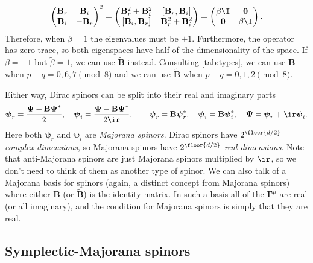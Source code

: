 \documentclass[11pt]{article}
\newcommand{\Gammab}{\boldsymbol{\Gamma}}
\newcommand{\B}{\mathbf{B}}
\newcommand{\Bt}{\widetilde{\B}}
\newcommand{\psib}{\boldsymbol{\psi}}
\newcommand{\Psib}{\boldsymbol{\Psi}}
\newcommand{\betat}{\tilde{\beta}}
\begin{document}
\begin{equation*}
    \begin{pmatrix}
      \B_r &  \B_i \\
      \B_i & -\B_r \\
    \end{pmatrix}^2
  =
    \begin{pmatrix}
      \B_r^2 + \B_i^2 & [\B_r, \B_i]    \\
      [\B_i, \B_r]    & \B_r^2 + \B_i^2 \\
    \end{pmatrix}
  =
    \begin{pmatrix}
      \beta \I   & \mathbf{0} \\
      \mathbf{0} & \beta \I   \\
    \end{pmatrix}.
\end{equation*}
%
Therefore, when $\beta=1$ the eigenvalues must be $\pm 1$.
Furthermore, the operator has zero trace, so both eigenspaces have half of the dimensionality of the space.
If $\beta=-1$ but $\betat=1$, we can use $\Bt$ instead.
Consulting \cref{tab:types}, we can use $\B$ when $p-q = 0,6,7 \pmod 8$ and we can use $\Bt$ when $p-q = 0,1,2 \pmod 8$.

Either way, Dirac spinors can be split into their real and imaginary parts
%
\begin{equation}\label{eq:majorana}
  \psib_r = \frac{\Psib + \B \Psib^\ast}{2},
  \quad
  \psib_i = \frac{\Psib - \B \Psib^\ast}{2\ir},
  \qquad
  \psib_r = \B \psib^\ast_r,
  \quad
  \psib_i = \B \psib^\ast_i,
  \quad
  \Psib = \psib_r + \ir \psib_i.
\end{equation}
%
Here both $\psib_r$ and $\psib_i$ are \emph{Majorana spinors}.
Dirac spinors have $2^{\floor{d/2}}$ \emph{complex dimensions}, so Majorana spinors have $2^{\floor{d/2}}$ \emph{real dimensions}.
Note that anti-Majorana spinors are just Majorana spinors multiplied by $\ir$, so we don't need to think of them as another type of spinor.
We can also talk of a Majorana basis for spinors (again, a distinct concept from Majorana spinors) where either $\B$ (or $\Bt$) is the identity matrix.
In such a basis all of the $\Gammab^\mu$ are real (or all imaginary), and the condition for Majorana spinors is simply that they are real.


\subsection{Symplectic-Majorana spinors}\label{sec:symplecticmajorana}
\end{document}
